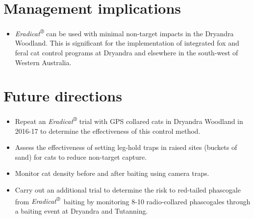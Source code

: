 \documentclass[version=last,
    paper=a4, %
    10pt, %
    usenames,
    dvipsnames,
    oneside, %
    headings=openany, %
    DIV=15 %
]{scrbook}
\begin{document}
\section*{Management implications}

\begin{itemize}
\itemsep1pt\parskip0pt
\item
  \emph{Eradicat\textsuperscript{®}} can be used with minimal non-target
  impacts in the Dryandra Woodland. This is significant for the
  implementation of integrated fox and feral cat control programs at
  Dryandra and elsewhere in the south-west of Western Australia.
\end{itemize}




\section*{Future directions}

\begin{itemize}
\itemsep1pt\parskip0pt
\item
  Repeat an \emph{Eradicat\textsuperscript{®}} trial with GPS collared
  cats in Dryandra Woodland in 2016-17 to determine the effectiveness of
  this control method.
\item
  Assess the effectiveness of setting leg-hold traps in raised sites
  (buckets of sand) for cats to reduce non-target capture.
\item
  Monitor cat density before and after baiting using camera traps.
\item
  Carry out an additional trial to determine the risk to red-tailed
  phascogale from \emph{Eradicat\textsuperscript{®}}~baiting by
  monitoring 8-10 radio-collared phascogales through a baiting event at
  Dryandra and Tutanning.
\end{itemize}



\end{document}
